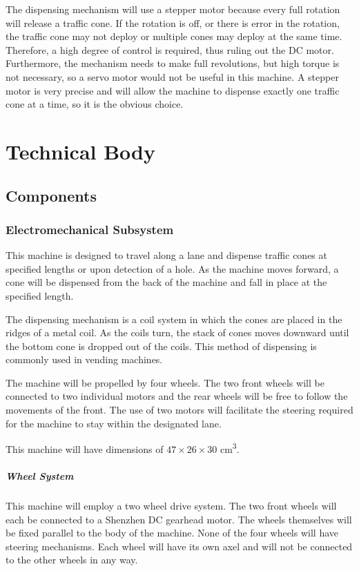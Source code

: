 \documentclass[11pt]{report}
\begin{document}
The dispensing mechanism will use a stepper motor because every full rotation will release a traffic cone. If the rotation is off, or there is error in the rotation, the traffic cone may not deploy or multiple cones may deploy at the same time. Therefore, a high degree of control is required, thus ruling out the DC motor. Furthermore, the mechanism needs to make full revolutions, but high torque is not necessary, so a servo motor would not be useful in this machine. A stepper motor is very precise and will allow the machine to dispense exactly one traffic cone at a time, so it is the obvious choice.



\chapter{Technical Body}
\section{Components}

\subsection{Electromechanical Subsystem}
This machine is designed to travel along a lane and dispense traffic cones at specified lengths or upon detection of a hole. As the machine moves forward, a cone will be dispensed from the back of the machine and fall in place at the specified length. 

The dispensing mechanism is a coil system in which the cones are placed in the ridges of a metal coil. As the coils turn, the stack of cones moves downward until the bottom cone is dropped out of the coils. This method of dispensing is commonly used in vending machines. 

The machine will be propelled by four wheels. The two front wheels will be connected to two individual motors and the rear wheels will be free to follow the movements of the front. The use of two motors will facilitate the steering required for the machine to stay within the designated lane.

This machine will have dimensions of $47\times 26\times 30$ cm\textsuperscript{3}.

\paragraph{Wheel System}

This machine will employ a two wheel drive system. The two front wheels will each be connected to a Shenzhen DC gearhead motor. The wheels themselves will be fixed parallel to the body of the machine. None of the four wheels will have steering mechanisms. Each wheel will have its own axel and will not be connected to the other wheels in any way.
\end{document}
